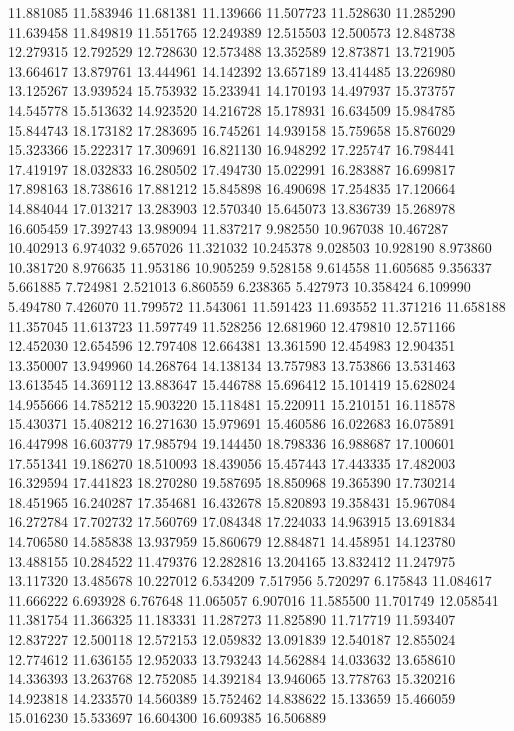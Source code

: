 11.881085
11.583946
11.681381
11.139666
11.507723
11.528630
11.285290
11.639458
11.849819
11.551765
12.249389
12.515503
12.500573
12.848738
12.279315
12.792529
12.728630
12.573488
13.352589
12.873871
13.721905
13.664617
13.879761
13.444961
14.142392
13.657189
13.414485
13.226980
13.125267
13.939524
15.753932
15.233941
14.170193
14.497937
15.373757
14.545778
15.513632
14.923520
14.216728
15.178931
16.634509
15.984785
15.844743
18.173182
17.283695
16.745261
14.939158
15.759658
15.876029
15.323366
15.222317
17.309691
16.821130
16.948292
17.225747
16.798441
17.419197
18.032833
16.280502
17.494730
15.022991
16.283887
16.699817
17.898163
18.738616
17.881212
15.845898
16.490698
17.254835
17.120664
14.884044
17.013217
13.283903
12.570340
15.645073
13.836739
15.268978
16.605459
17.392743
13.989094
11.837217
9.982550
10.967038
10.467287
10.402913
6.974032
9.657026
11.321032
10.245378
9.028503
10.928190
8.973860
10.381720
8.976635
11.953186
10.905259
9.528158
9.614558
11.605685
9.356337
5.661885
7.724981
2.521013
6.860559
6.238365
5.427973
10.358424
6.109990
5.494780
7.426070
11.799572
11.543061
11.591423
11.693552
11.371216
11.658188
11.357045
11.613723
11.597749
11.528256
12.681960
12.479810
12.571166
12.452030
12.654596
12.797408
12.664381
13.361590
12.454983
12.904351
13.350007
13.949960
14.268764
14.138134
13.757983
13.753866
13.531463
13.613545
14.369112
13.883647
15.446788
15.696412
15.101419
15.628024
14.955666
14.785212
15.903220
15.118481
15.220911
15.210151
16.118578
15.430371
15.408212
16.271630
15.979691
15.460586
16.022683
16.075891
16.447998
16.603779
17.985794
19.144450
18.798336
16.988687
17.100601
17.551341
19.186270
18.510093
18.439056
15.457443
17.443335
17.482003
16.329594
17.441823
18.270280
19.587695
18.850968
19.365390
17.730214
18.451965
16.240287
17.354681
16.432678
15.820893
19.358431
15.967084
16.272784
17.702732
17.560769
17.084348
17.224033
14.963915
13.691834
14.706580
14.585838
13.937959
15.860679
12.884871
14.458951
14.123780
13.488155
10.284522
11.479376
12.282816
13.204165
13.832412
11.247975
13.117320
13.485678
10.227012
6.534209
7.517956
5.720297
6.175843
11.084617
11.666222
6.693928
6.767648
11.065057
6.907016
11.585500
11.701749
12.058541
11.381754
11.366325
11.183331
11.287273
11.825890
11.717719
11.593407
12.837227
12.500118
12.572153
12.059832
13.091839
12.540187
12.855024
12.774612
11.636155
12.952033
13.793243
14.562884
14.033632
13.658610
14.336393
13.263768
12.752085
14.392184
13.946065
13.778763
15.320216
14.923818
14.233570
14.560389
15.752462
14.838622
15.133659
15.466059
15.016230
15.533697
16.604300
16.609385
16.506889
